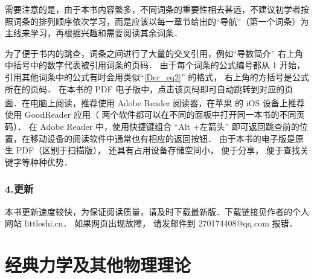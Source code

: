 需要注意的是，由于本书内容繁多，不同词条的重要性相去甚远，不建议初学者按照词条的排列顺序依次学习，而是应该以每一章节给出的“导航”（第一个词条）为主线来学习，再根据兴趣和需要阅读其余词条．

为了便于书内的跳查，词条之间进行了大量的交叉引用，例如“导数简介” 右上角中括号中的数字代表被引用词条的页码． 由于每个词条的公式编号都从 1 开始， 引用其他词条中的公式有时会用类似“\autoref{Der_eq2}” 的格式， 右上角的方括号是公式所在的页码． 在本书的 PDF 电子版中，点击该页码即可自动跳转到对应的页面．在电脑上阅读，推荐使用 Adobe Reader 阅读器，在苹果\textsuperscript{\textregistered} 的 iOS 设备上推荐使用 GoodReader 应用（ 两个软件都可以在不同的面板中打开同一本书的不同页码）． 在 Adobe Reader 中，使用快捷键组合 “Alt +左箭头” 即可返回跳查前的位置，在移动设备的阅读软件中通常也有相应的返回按钮． 由于本书的电子版是原生 PDF（区别于扫描版）， 还具有占用设备存储空间小， 便于分享， 便于查找关键字等种种优势．

\subsection{4.更新}
本书更新速度较快，为保证阅读质量，请及时下载最新版．下载链接见作者的个人网站 littleshi.cn． 如果网页出现故障， 请发邮件到 270174408@qq.com 报错．





\chapter*{经典力学及其他物理理论}


